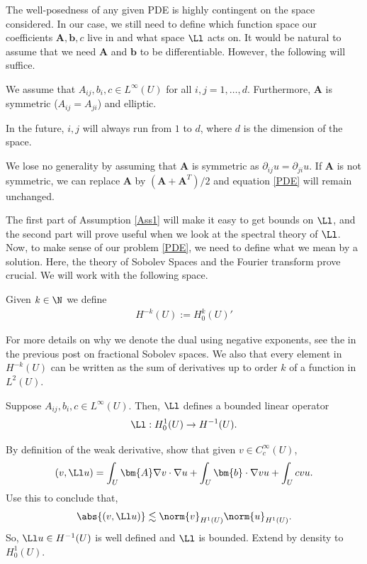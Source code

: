 \documentclass[
    a4paper,
    DIV=14,
    abstract=true,
    numbers=noenddot
]{scrartcl}
\begin{document}
The well-posedness of any given PDE is highly contingent on the space considered. In our case, we still need to define which function space our coefficients $\bm{A,b},c$ live in and what space $\Ll$ acts on. It would be natural to assume that we need $\bm{A}$ and $\bm{b}$ to be differentiable. However, the following will suffice.
\begin{assumption}\label{Ass1}
    We assume that $A_{ij}, b_i, c \in L^\infty (U)$ for all $i,j=1,\ldots,d$. Furthermore, $\bm{A}$ is symmetric ($A_{ij}=A_{ji}$) and elliptic.
\end{assumption}
In the future, $i,j$ will always run from $1$ to $d$, where $d$ is the dimension of the space.
\begin{observation}
    We lose no generality by assuming that $\bm{A}$ is symmetric as $\partial _{ij} u =\partial _{ji} u$. If $\bm{A}$ is not symmetric, we can replace $\bm{A}$ by $(\bm{A}+\bm{A}^T)/2$ and equation \eqref{PDE} will remain unchanged.
\end{observation}
The first part of Assumption \ref{Ass1} will make it easy to get bounds on $\Ll$, and the second part will prove useful when we look at the spectral theory of $\Ll$. Now, to make sense of our problem \eqref{PDE}, we need to define what we mean by a solution. Here, the theory of Sobolev Spaces and the Fourier transform prove crucial. We will work with the following space.
\begin{definition}\label{dual definition 2}
    Given $k \in \N$ we define
    \begin{align*}
        H^{-k}(U ):= H_0^k(U )'
    \end{align*}
\end{definition}
For more details on why we denote the dual using negative exponents, see the  in the previous post on fractional Sobolev spaces. We  also that every element in $H^{-k}(U)$ can be written as the sum of derivatives up to order $k$ of a function in $L^2(U)$.
\begin{exercise}\label{domain L}
    Suppose $A_{ij}, b_i, c \in L^\infty(U)$. Then, $\Ll $ defines a bounded linear operator
    \begin{align*}
        \Ll : H_0^{1}(U)\to H^{-1} (U).
    \end{align*}
\end{exercise}
\begin{hint}
    By definition of the weak derivative, show that given $v \in C_c^\infty(U)$,
    \begin{align*}
        (v, \Ll u) = \int_{U} \bm{A} \nabla v \cdot \nabla u + \int_{U} \bm{b} \cdot \nabla v u + \int_{U} cvu.
    \end{align*}
    Use this to conclude that,
    \begin{align*}
        \abs{(v, \Ll u)} \lesssim \norm{v}_{H^1(U)}\norm{u}_{H^1(U)}.
    \end{align*}
    So, $\Ll u \in H^{-1}(U)$ is well defined and $\Ll $ is bounded. Extend by density to $H_0^1(U)$.
\end{hint}
\end{document}
